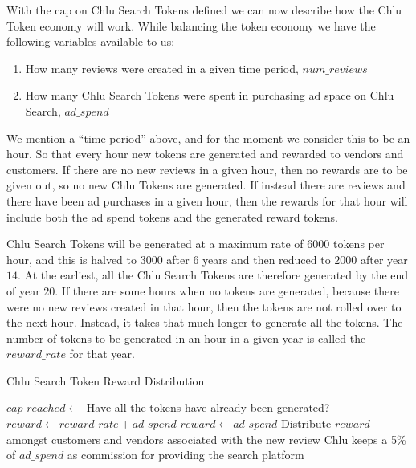 \documentclass[a4paper]{article}
\begin{document}
With the cap on Chlu Search Tokens defined we can now describe how the
Chlu Token economy will work. While balancing the token economy we
have the following variables available to us:

\begin{enumerate}
\item How many reviews were created in a given time period, $num\_reviews$
\item How many Chlu Search Tokens were spent in purchasing ad space on
  Chlu Search, $ad\_spend$
\end{enumerate}

We mention a ``time period'' above, and for the moment we consider
this to be an hour. So that every hour new tokens are generated and
rewarded to vendors and customers. If there are no new reviews in a
given hour, then no rewards are to be given out, so no new Chlu Tokens
are generated. If instead there are reviews and there have been ad
purchases in a given hour, then the rewards for that hour will include
both the ad spend tokens and the generated reward tokens.

Chlu Search Tokens will be generated at a maximum rate of $6000$
tokens per hour, and this is halved to $3000$ after $6$ years and then
reduced to $2000$ after year $14$. At the earliest, all the Chlu
Search Tokens are therefore generated by the end of year $20$. If
there are some hours when no tokens are generated, because there were
no new reviews created in that hour, then the tokens are not rolled
over to the next hour. Instead, it takes that much longer to generate
all the tokens. The number of tokens to be generated in an hour in a
given year is called the $reward\_rate$ for that year.

\begin{algorithm}
  \caption{Chlu Search Token Reward Distribution}
  \label{reward-algo}
  \begin{algorithmic}
    \STATE $cap\_reached \leftarrow$ Have all the tokens have already been generated?
    \STATE $reward \leftarrow reward\_rate + ad\_spend$
    \STATE $reward \leftarrow ad\_spend$
    \ENDIF
    \STATE Distribute $reward$ amongst customers and vendors associated with the new review
    \STATE Chlu keeps a 5\% of $ad\_spend$ as  commission for providing the search platform
  \end{algorithmic}    
\end{algorithm}
\end{document}
